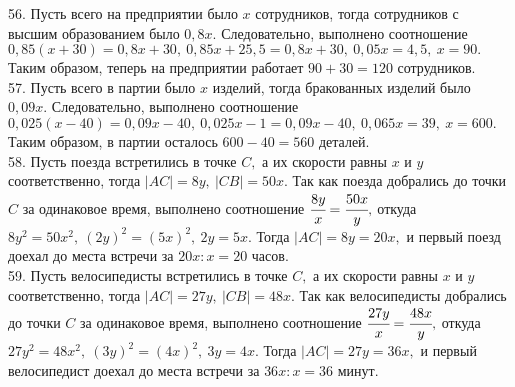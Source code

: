 56. Пусть всего на предприятии было $x$ сотрудников, тогда сотрудников с высшим образованием было $0,8x.$ Следовательно, выполнено соотношение $0,85(x+30)=0,8x+30,\ 0,85x+25,5=0,8x+30,\ 0,05x=4,5,\ x=90.$ Таким образом, теперь на предприятии работает $90+30=120$ сотрудников.\\
57. Пусть всего в партии было $x$ изделий, тогда бракованных изделий было $0,09x.$ Следовательно, выполнено соотношение $0,025(x-40)=0,09x-40,\ 0,025x-1=0,09x-40,\ 0,065x=39,\ x=600.$ Таким образом, в партии осталось $600-40=560$ деталей.\\
58. Пусть поезда встретились в точке $C,$ а их скорости равны $x$ и $y$ соответственно, тогда $|AC|=8y,\ |CB|=50x.$ Так как поезда добрались до точки $C$ за одинаковое время, выполнено соотношение $\cfrac{8y}{x}=\cfrac{50x}{y},$ откуда $8y^2=50x^2,\ (2y)^2=(5x)^2,\ 2y=5x.$ Тогда $|AC|=8y=20x,$ и первый поезд доехал до места встречи за $20x:x=20$ часов.\\
59. Пусть велосипедисты встретились в точке $C,$ а их скорости равны $x$ и $y$ соответственно, тогда $|AC|=27y,\ |CB|=48x.$ Так как велосипедисты добрались до точки $C$ за одинаковое время, выполнено соотношение $\cfrac{27y}{x}=\cfrac{48x}{y},$ откуда $27y^2=48x^2,\ (3y)^2=(4x)^2,\ 3y=4x.$ Тогда $|AC|=27y=36x,$ и первый велосипедист доехал до места встречи за $36x:x=36$ минут.
\newpage
